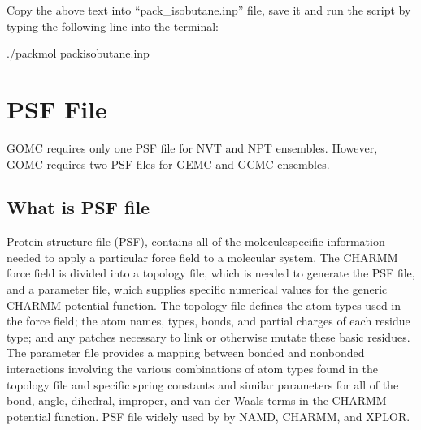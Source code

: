 \documentclass[letterpaper,10pt,english]{sphinxmanual}
\begin{document}
\sphinxAtStartPar
Copy the above text into “pack\_isobutane.inp” file, save it and run the script by typing the following line into the terminal:

\begin{sphinxVerbatim}[commandchars=\\\{\}]
\PYGZdl{} ./packmol \PYGZlt{} pack\PYGZus{}isobutane.inp
\end{sphinxVerbatim}


\section{PSF File}
\label{\detokenize{input_file:psf-file}}
\sphinxAtStartPar
GOMC requires only one PSF file for NVT and NPT ensembles. However, GOMC requires two PSF files for GEMC and GCMC ensembles.


\subsection{What is PSF file}
\label{\detokenize{input_file:what-is-psf-file}}
\sphinxAtStartPar
Protein structure file (PSF), contains all of the molecule\sphinxhyphen{}specific information needed to apply a particular force field to a molecular system.
The CHARMM force field is divided into a topology file, which is needed to generate the PSF file, and a parameter file, which supplies specific numerical
values for the generic CHARMM potential function. The topology file defines the atom types used in the force field; the atom names, types, bonds, and partial
charges of each residue type; and any patches necessary to link or otherwise mutate these basic residues. The parameter file provides a mapping between bonded
and nonbonded interactions involving the various combinations of atom types found in the topology file and specific spring constants and similar parameters for
all of the bond, angle, dihedral, improper, and van der Waals terms in the CHARMM potential function. PSF file widely used by by NAMD, CHARMM, and X\sphinxhyphen{}PLOR.
\end{document}
